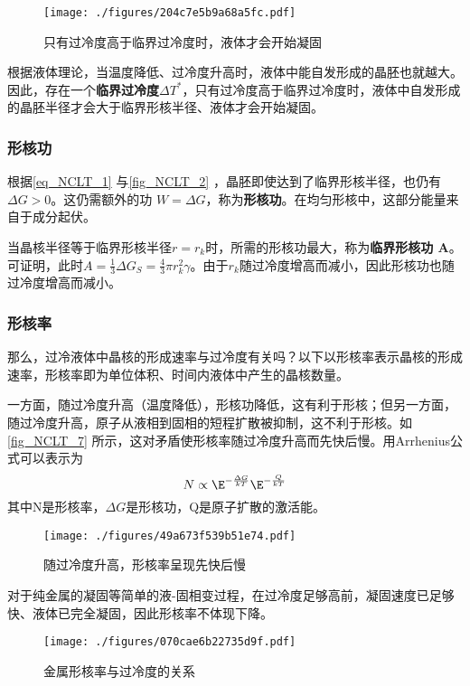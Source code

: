 \begin{figure}[ht]
\centering
\texttt{[image: ./figures/204c7e5b9a68a5fc.pdf]}
\caption{只有过冷度高于临界过冷度时，液体才会开始凝固} \label{fig_NCLT_4}
\end{figure}
根据液体理论，当温度降低、过冷度升高时，液体中能自发形成的晶胚也就越大。因此，存在一个\textbf{临界过冷度$\Delta T^*$}，只有过冷度高于临界过冷度时，液体中自发形成的晶胚半径才会大于临界形核半径、液体才会开始凝固。

\subsubsection{形核功}
根据\autoref{eq_NCLT_1} 与\autoref{fig_NCLT_2} ，晶胚即使达到了临界形核半径，也仍有$\Delta G>0$。这仍需额外的功 $W=\Delta G$，称为\textbf{形核功}。在均匀形核中，这部分能量来自于成分起伏。

当晶核半径等于临界形核半径$r=r_k$时，所需的形核功最大，称为\textbf{临界形核功 A}。可证明，此时$A=\frac{1}{3}\Delta G_S=\frac{4}{3}\pi r_k^2 \gamma$。由于$r_k$随过冷度增高而减小，因此形核功也随过冷度增高而减小。%

\subsubsection{形核率}
那么，过冷液体中晶核的形成速率与过冷度有关吗？以下以形核率表示晶核的形成速率，形核率即为单位体积、时间内液体中产生的晶核数量。%

一方面，随过冷度升高（温度降低），形核功降低，这有利于形核；但另一方面，随过冷度升高，原子从液相到固相的短程扩散被抑制，这不利于形核。如\autoref{fig_NCLT_7} 所示，这对矛盾使形核率随过冷度升高而先快后慢。用Arrhenius公式可以表示为
$$N \propto \E^{-\frac{\Delta G}{kT}} \E^{-\frac{Q}{kT}}$$
其中N是形核率，$\Delta G$是形核功，Q是原子扩散的激活能。
\begin{figure}[ht]
\centering
\texttt{[image: ./figures/49a673f539b51e74.pdf]}
\caption{随过冷度升高，形核率呈现先快后慢} \label{fig_NCLT_7}
\end{figure}

对于纯金属的凝固等简单的液-固相变过程，在过冷度足够高前，凝固速度已足够快、液体已完全凝固，因此形核率不体现下降。
\begin{figure}[ht]
\centering
\texttt{[image: ./figures/070cae6b22735d9f.pdf]}
\caption{金属形核率与过冷度的关系} \label{fig_NCLT_8}
\end{figure}

